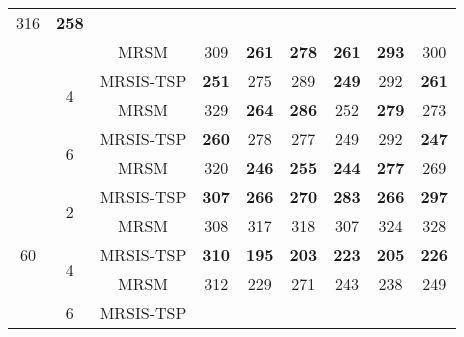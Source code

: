 \begin{table}[]
\begin{tabular}{|c|c|c|cccccc|}
  \multicolumn{1}{c|}{316} &
  \textbf{258} \\ \cline{3-9}
 &
   &
  MRSM &
  \multicolumn{1}{c|}{309} &
  \multicolumn{1}{c|}{\textbf{261}} &
  \multicolumn{1}{c|}{\textbf{278}} &
  \multicolumn{1}{c|}{\textbf{261}} &
  \multicolumn{1}{c|}{\textbf{293}} &
  300 \\ \cline{2-9}
 &
  \multirow{2}{*}{4} &
  MRSIS-TSP\cite{li2024mrsis} &
  \multicolumn{1}{c|}{\textbf{251}} &
  \multicolumn{1}{c|}{275} &
  \multicolumn{1}{c|}{289} &
  \multicolumn{1}{c|}{\textbf{249}} &
  \multicolumn{1}{c|}{292} &
  \textbf{261} \\ \cline{3-9}
 &
   &
  MRSM &
  \multicolumn{1}{c|}{329} &
  \multicolumn{1}{c|}{\textbf{264}} &
  \multicolumn{1}{c|}{\textbf{286}} &
  \multicolumn{1}{c|}{252} &
  \multicolumn{1}{c|}{\textbf{279}} &
  273 \\ \cline{2-9}
 &
  \multirow{2}{*}{6} &
  MRSIS-TSP\cite{li2024mrsis} &
  \multicolumn{1}{c|}{\textbf{260}} &
  \multicolumn{1}{c|}{278} &
  \multicolumn{1}{c|}{277} &
  \multicolumn{1}{c|}{249} &
  \multicolumn{1}{c|}{292} &
  \textbf{247} \\ \cline{3-9}
 &
   &
  MRSM &
  \multicolumn{1}{c|}{320} &
  \multicolumn{1}{c|}{\textbf{246}} &
  \multicolumn{1}{c|}{\textbf{255}} &
  \multicolumn{1}{c|}{\textbf{244}} &
  \multicolumn{1}{c|}{\textbf{277}} &
  269 \\ \hline\hline
\multirow{6}{*}{60} &
  \multirow{2}{*}{2} &
  MRSIS-TSP\cite{li2024mrsis} &
  \multicolumn{1}{c|}{\textbf{307}} &
  \multicolumn{1}{c|}{\textbf{266}} &
  \multicolumn{1}{c|}{\textbf{270}} &
  \multicolumn{1}{c|}{\textbf{283}} &
  \multicolumn{1}{c|}{\textbf{266}} &
  \textbf{297} \\ \cline{3-9}
 &
   &
  MRSM &
  \multicolumn{1}{c|}{308} &
  \multicolumn{1}{c|}{317} &
  \multicolumn{1}{c|}{318} &
  \multicolumn{1}{c|}{307} &
  \multicolumn{1}{c|}{324} &
  328 \\ \cline{2-9}
 &
  \multirow{2}{*}{4} &
  MRSIS-TSP\cite{li2024mrsis} &
  \multicolumn{1}{c|}{\textbf{310}} &
  \multicolumn{1}{c|}{\textbf{195}} &
  \multicolumn{1}{c|}{\textbf{203}} &
  \multicolumn{1}{c|}{\textbf{223}} &
  \multicolumn{1}{c|}{\textbf{205}} &
  \textbf{226} \\ \cline{3-9}
 &
   &
  MRSM &
  \multicolumn{1}{c|}{312} &
  \multicolumn{1}{c|}{229} &
  \multicolumn{1}{c|}{271} &
  \multicolumn{1}{c|}{243} &
  \multicolumn{1}{c|}{238} &
  249 \\ \cline{2-9}
 &
  \multirow{2}{*}{6} &
  MRSIS-TSP\cite{li2024mrsis} &

\end{tabular}
\end{table}
